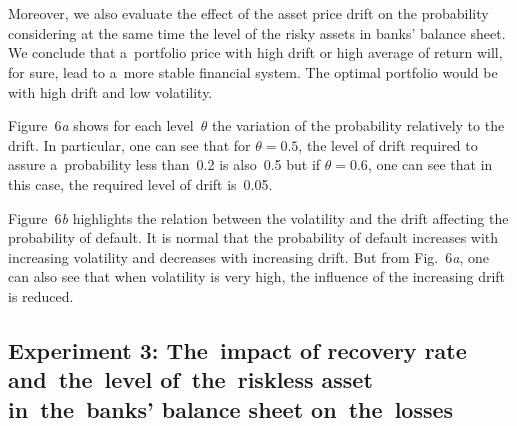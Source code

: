 \begin{multicols}{2}
         \begin{figure*}[b]  %
 \vspace*{-3pt}
 \begin{minipage}[t]{80mm}
 \begin{center}
\mbox{%
\epsfxsize=78.822mm
}
\end{center}
\vspace*{-12pt}
\end{minipage}
\hfill
 \vspace*{-3pt}
  \begin{minipage}[t]{80mm}
 \begin{center}
\mbox{%
\epsfxsize=78.336mm
}
\end{center}
\vspace*{-12pt}
\end{minipage}
\end{figure*}
        
           



Moreover, we also evaluate the effect of the asset price drift on the 
probability considering at the same time the level of the risky assets in banks' 
balance sheet. We conclude that a~portfolio price with high drift or high 
average of return will, for sure, lead to a~more stable financial system.  The 
optimal portfolio would be with high drift and low volatility.

Figure~6\textit{a} shows for each level~$\theta$ the variation of the probability 
relatively to the drift. In particular, one can see that for $\theta = 0.5$, the 
level of drift required to assure a~probability less than~0.2 is also~0.5 
but if $\theta = 0.6$, one can see that  in this case,
the required level of drift is~0.05.

Figure~6\textit{b} highlights the relation between the volatility and the drift affecting 
the probability of default. It is normal that the probability of default 
increases with increasing volatility and decreases with increasing drift. But 
from Fig.~6\textit{a}, one can 
also see that when volatility is very high, the influence of 
the increasing drift is reduced.
{

}




\subsection{Experiment 3: The~impact of recovery rate and~the~level of~the~riskless 
asset in~the~banks' balance sheet on~the~losses}


\end{multicols}
